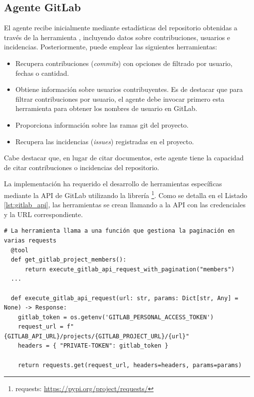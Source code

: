 \subsection{Agente GitLab}
El agente recibe inicialmente mediante  estadísticas del repositorio obtenidas a través de la herramienta , incluyendo datos sobre contribuciones, usuarios e incidencias. Posteriormente, puede emplear las siguientes herramientas:
\begin{itemize}
  \item{} Recupera contribuciones (\textit{commits}) con opciones de filtrado por usuario, fechas o cantidad.
\item{} Obtiene información sobre usuarios contribuyentes. Es de destacar que para filtrar contribuciones por usuario, el agente debe invocar primero esta herramienta para obtener los nombres de usuario en GitLab.
\item{} Proporciona información sobre las ramas git del proyecto.
\item{} Recupera las incidencias (\textit{issues}) registradas en el proyecto.
\end{itemize}
Cabe destacar que, en lugar de citar documentos, este agente tiene la capacidad de citar contribuciones o incidencias del repositorio.

La implementación ha requerido el desarrollo de herramientas específicas mediante la API de GitLab utilizando la librería \footnote{requests: \url{https://pypi.org/project/requests/}}. Como se detalla en el Listado \ref{lst:gitlab_api}, las herramientas se crean llamando a la API con las credenciales y la URL correspondiente.

\begin{lstlisting}[caption={Ejemplo de herramienta para agente GitLab directamente desde la API},label={lst:gitlab_api}]
  # La herramienta llama a una función que gestiona la paginación en varias requests 
  @tool
  def get_gitlab_project_members():
      return execute_gitlab_api_request_with_pagination("members")
  ...

  def execute_gitlab_api_request(url: str, params: Dict[str, Any] = None) -> Response:
    gitlab_token = os.getenv('GITLAB_PERSONAL_ACCESS_TOKEN')
    request_url = f"{GITLAB_API_URL}/projects/{GITLAB_PROJECT_URL}/{url}"
    headers = { "PRIVATE-TOKEN": gitlab_token }

    return requests.get(request_url, headers=headers, params=params)
\end{lstlisting}



















